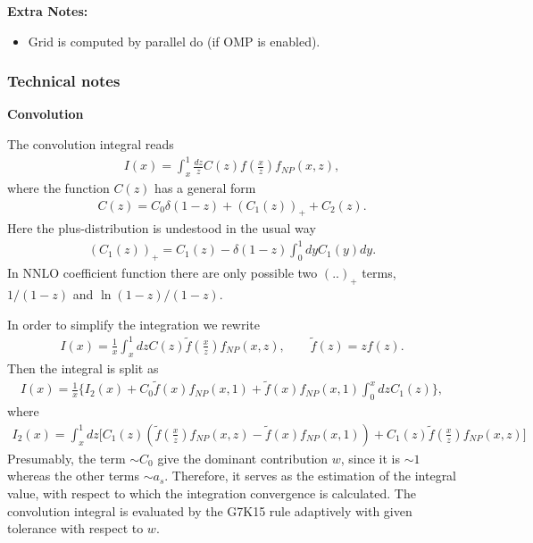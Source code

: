 \documentclass[prd,nofootinbib,eqsecnum,final]{revtex4}
\renewcommand{\(}{\left(}
\renewcommand{\)}{\right)}
\renewcommand{\[}{\left[}
\renewcommand{\]}{\right]}
\begin{document}
\textbf{Extra Notes:}
\begin{itemize}
\item Grid is computed by parallel do (if OMP is enabled).
\end{itemize}

\subsubsection{Technical notes}
\label{sec:technicalNote_1}

\begin{center}
\textbf{Convolution}
\end{center}

The convolution integral reads
\begin{eqnarray}
I(x)=\int_x^1 \frac{dz}{z}C(z)f\(\frac{x}{z}\)f_{NP}(x,z),
\end{eqnarray}
where the function $C(z)$ has a general form
\begin{eqnarray}
C(z)=C_0 \delta(1-z)+\(C_1(z)\)_++C_2(z).
\end{eqnarray}
Here the plus-distribution is undestood in the usual way
\begin{eqnarray}
\(C_1(z)\)_+=C_1(z)-\delta(1-z)\int_0^1 dy C_1(y)dy.
\end{eqnarray}
In NNLO coefficient function there are only possible two $(..)_+$ terms, $1/(1-z)$ and $\ln(1-z)/(1-z)$.

In order to simplify the integration we rewrite
\begin{eqnarray}
I(x)=\frac{1}{x}\int_x^1 dz C(z)\tilde f\(\frac{x}{z}\)f_{NP}(x,z),\qquad \tilde f(z)=zf(z).
\end{eqnarray}
Then the integral is split as
\begin{eqnarray}
I(x)=\frac{1}{x}\Big\{I_2(x)+C_0\tilde f\(x\)f_{NP}(x,1)+\tilde f\(x\)f_{NP}(x,1)\int_0^x dz C_1(z)\Big\},
\end{eqnarray}
where
\begin{eqnarray}
I_2(x)=\int_x^1 dz \Big[C_1(z)\(\tilde f\(\frac{x}{z}\)f_{NP}(x,z)-\tilde f\(x\)f_{NP}(x,1)\)+C_1(z)\tilde f\(\frac{x}{z}\)f_{NP}(x,z)\Big]
\end{eqnarray}
Presumably, the term $\sim C_0$ give the dominant contribution $w$, since it is $\sim 1$ whereas the other terms $\sim a_s$. Therefore, it serves as the estimation of the integral value, with respect to which the integration convergence is calculated. The convolution integral is evaluated by the G7K15 rule adaptively with given tolerance with respect to $w$. 
\end{document}
